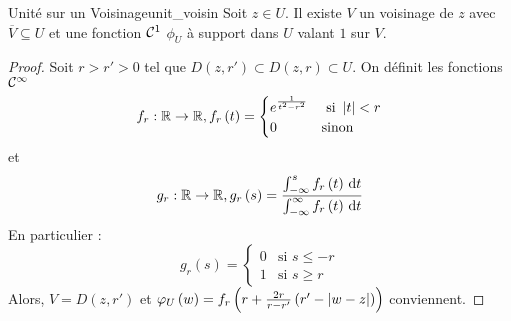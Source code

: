 \documentclass{cours}
\begin{document}
\begin{lemme}{Unité sur un Voisinage}{unit_voisin}
    Soit $z \in U$. Il existe $V$ un voisinage de $z$ avec $\overline{V}\subseteq U$ et une fonction $\mathcal{C}^{1}$ $\phi_{U}$ à support dans $U$ valant $1$ sur $V$. 
\end{lemme}
\begin{proof}
    Soit $r > r'>0$ tel que $D\left(z, r'\right) \subset D\left(z, r\right) \subset U$. On définit les fonctions $\mathcal{C}^{\infty}$ 
    \begin{equation*}
        f_{r} : \mathbb{R} \to \mathbb{R}, f_{r}\left(t\right) = \begin{cases}
            e^{\frac{1}{t^{2}-r^{2}}} & \text{ si } \left|t\right| < r\\
            0 & \text{sinon}
        \end{cases}
    \end{equation*}
    et 
    \begin{equation*}
        g_{r} : \mathbb{R} \to \mathbb{R}, g_{r}\left(s\right) = \frac{\int_{-\infty}^{s}f_{r}\left(t\right){\rm \, d} t}{\int_{- \infty}^{\infty}f_{r}\left(t\right){\rm \, d} t}
    \end{equation*}
    En particulier : 
    \begin{equation*}
        g_{r}\left(s\right) = \begin{cases}
            0 & \text{si } s \leq -r\\
            1 & \text{si } s \geq r
        \end{cases}
    \end{equation*}
    Alors, $V = D\left(z, r'\right)$ et $\varphi_{U}\left(w\right) = f_{r}\left(r + \frac{2r}{r-r'}\left(r'-\left|w - z\right|\right)\right)$ conviennent. 
\end{proof}
\end{document}
